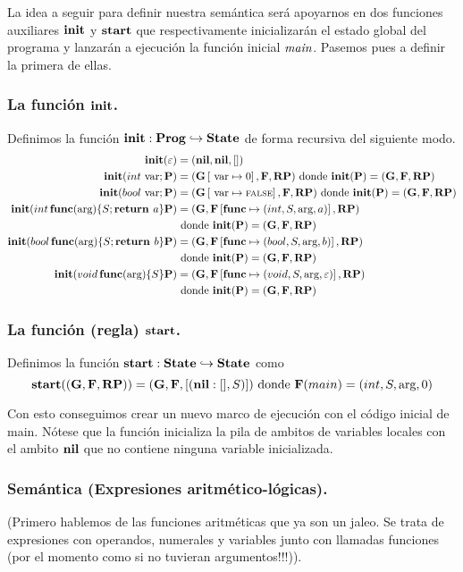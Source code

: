 La idea a seguir para definir nuestra semántica será apoyarnos en dos funciones auxiliares $\textbf{init}$ y $\textbf{start}$ que respectivamente inicializarán el estado global del programa y lanzarán a ejecución la función inicial $\textit{main}$. Pasemos pues a definir la primera de ellas.

\subsubsection{La función $\textbf{init}$.}
Definimos la función $\textbf{init}: \textbf{Prog} \hookrightarrow \textbf{State}$ de forma recursiva del siguiente modo.
\begin{align*}
  \textbf{init}(\varepsilon) &= (\textbf{nil}, \textbf{nil}, [])\\
  \textbf{init}(int \text{ var} \mbox{;\,} \mathbf{P}) &= (\mathbf{G}\left[ \text{ var}\mapsto0 \right], \mathbf{F}, \textbf{RP}) \text{ donde } \textbf{init}(\mathbf{P}) = (\mathbf{G}, \mathbf{F}, \textbf{RP})\\
  \textbf{init}(bool \text{ var} \mbox{;\,} \mathbf{P}) &= (\mathbf{G}\left[ \text{ var}\mapsto\text{\scriptsize{FALSE}} \right], \mathbf{F}, \textbf{RP}) \text{ donde } \textbf{init}(\mathbf{P}) = (\mathbf{G}, \mathbf{F}, \textbf{RP})\\
  \textbf{init}(int \, \textbf{func}(\text{arg}) \{ S\mbox{;\,} \textbf{return } a\} \mathbf{P}) &= (\mathbf{G}, \mathbf{F}\left[ \textbf{func}\mapsto(int, S, \text{arg}, a) \right], \textbf{RP}) \\ &\text{ donde } \textbf{init}(\mathbf{P}) = (\mathbf{G}, \mathbf{F}, \textbf{RP})\\
  \textbf{init}(bool \, \textbf{func}(\text{arg}) \{ S\mbox{;\,} \textbf{return } b\} \mathbf{P}) &= (\mathbf{G}, \mathbf{F}\left[ \textbf{func}\mapsto(bool, S, \text{arg}, b) \right], \textbf{RP}) \\ &\text{ donde } \textbf{init}(\mathbf{P}) = (\mathbf{G}, \mathbf{F}, \textbf{RP})\\
  \textbf{init}(void \, \textbf{func}(\text{arg}) \{ S\} \mathbf{P}) &= (\mathbf{G}, \mathbf{F}\left[ \textbf{func}\mapsto(void, S, \text{arg}, \varepsilon) \right], \textbf{RP}) \\ &\text{ donde } \textbf{init}(\mathbf{P}) = (\mathbf{G}, \mathbf{F}, \textbf{RP})\\
\end{align*}
\subsubsection{La función (regla) $\textbf{start}$.}
Definimos la función $\textbf{start}: \textbf{State} \hookrightarrow \textbf{State}$ como
$$
\textbf{start}((\mathbf{G}, \mathbf{F}, \textbf{RP})) = (\mathbf{G}, \mathbf{F}, [(\textbf{nil}:[], S)]) \text{ donde } \mathbf{F}(main) = (int, S, \text{arg}, 0)
$$

Con esto conseguimos crear un nuevo marco de ejecución con el código inicial de main. Nótese que la función inicializa la pila de ambitos de variables locales con el ambito $\textbf{nil}$ que no contiene ninguna variable inicializada.

\subsubsection{Semántica (Expresiones aritmético-lógicas).}
(Primero hablemos de las funciones aritméticas que ya son un jaleo. Se trata de expresiones con operandos, numerales y variables junto con llamadas funciones (por el momento como si no tuvieran argumentos!!!)).\\

